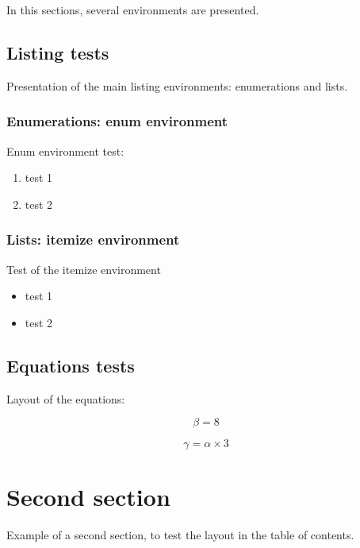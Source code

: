 \documentclass[letterpaper%
, twoside%
, 12pt%
,these%
, english%
,creativecommons,hyperref, withAlgo2e %
]{thETS}
\begin{document}
In this sections, several environments are presented.

\subsection{Listing tests}

Presentation of the main listing environments: enumerations and lists.


\subsubsection{Enumerations: enum environment}

Enum environment test:
\begin{enumerate}
 \item test 1
 \item test 2
\end{enumerate}


\subsubsection{Lists: itemize environment}

Test of the itemize environment
\begin{itemize}
 \item test 1
 \item test 2
\end{itemize}



\subsection{Equations tests}

Layout of the equations:

\begin{equation}
   \beta = 8
\end{equation}

\begin{equation}
   \gamma = \alpha \times 3
\end{equation}

\section{Second section}

Example of a second section, to test the layout in the table of contents.
\end{document}

